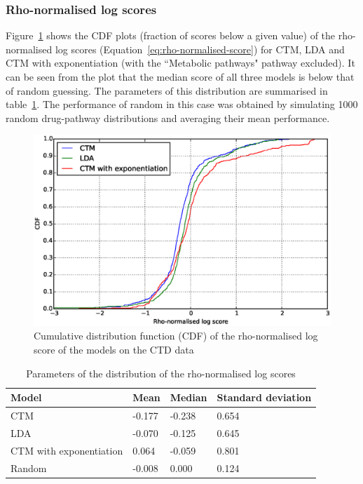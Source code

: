 \documentclass[12pt,a4paper,twoside,openright]{report}
\begin{document}
\subsubsection{Rho-normalised log scores}
Figure~\ref{fig:ctd-rho-cdf} shows the CDF plots (fraction of scores below a given value) of the rho-normalised log scores (Equation~\ref{eq:rho-normalised-score}) for CTM, LDA and CTM with exponentiation (with the ``Metabolic pathways" pathway excluded). It can be seen from the plot that the median score of all three models is below that of random guessing. The parameters of this distribution are summarised in table~\ref{tab:ctm-cdf-summary}. The performance of random in this case was obtained by simulating 1000 random drug-pathway distributions and averaging their mean performance.

\begin{figure}[!htb]
\includegraphics[width=\textwidth]{ctd-rho-cdf.eps}
\caption{Cumulative distribution function (CDF) of the rho-normalised log score of the models on the CTD data}
\label{fig:ctd-rho-cdf}
\end{figure}

\begin{table}
\begin{tabular}{| l | l | l | l |}
\hline
Model & Mean & Median & Standard deviation\\
\hline
CTM & -0.177 & -0.238 & 0.654 \\
LDA & -0.070 & -0.125 & 0.645 \\
CTM with exponentiation & 0.064 & -0.059 & 0.801 \\
Random & -0.008 & 0.000 & 0.124 \\
\hline
\end{tabular}
\caption{Parameters of the distribution of the rho-normalised log scores}
\label{tab:ctm-cdf-summary}
\end{table}
\end{document}
